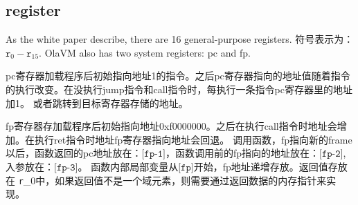 \subsection{register}\label{subsec: processor-register}

As the white paper describe, there are 16 general-purpose registers.
符号表示为： $ \texttt{r}_0 - \texttt{r}_{15} $.
OlaVM also has two system registers: pc and fp.

pc寄存器加载程序后初始指向地址1的指令。之后pc寄存器指向的地址值随着指令的执行改变。在没执行jump指令和call指令时，每执行一条指令pc寄存器里的地址加1。
或者跳转到目标寄存器存储的地址。

fp寄存器存加载程序后初始指向地址0xf0000000。之后在执行call指令时地址会增加。在执行ret指令时地址fp寄存器指向地址会回退。
调用函数，fp指向新的frame以后，函数返回的pc地址放在：$\texttt{[fp-1]}$，函数调用前的fp指向的地址放在：$\texttt{[fp-2]}$, 入参放在：$\texttt{[fp-3]}$。
函数内部局部变量从$\texttt{[fp]}$开始，fp地址递增存放。返回值存放在 \texttt{r}_0中，如果返回值不是一个域元素，则需要通过返回数据的内存指针来实现。
